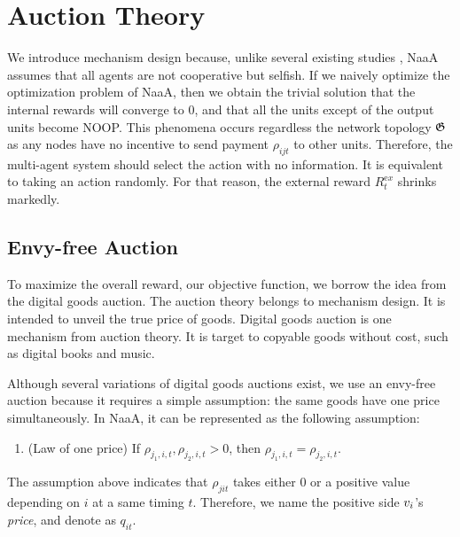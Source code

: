 \section{Auction Theory}



We introduce mechanism design because, unlike several existing studies \citep{sukhbaatar2016learning}, NaaA assumes that all agents are not cooperative but selfish.
If we naively optimize the optimization problem of NaaA, then we obtain the trivial solution that the internal rewards will converge to 0, and that all the units except of the output units become NOOP.
This phenomena occurs regardless the network topology $\mathfrak{G}$ as any nodes have no incentive to send payment $\rho_{ijt}$ to other units.
Therefore, the multi-agent system should select the action with no information. It is equivalent to taking an action randomly.
For that reason, the external reward $R_t^{\mathrm ex}$ shrinks markedly.

\subsection{Envy-free Auction}
To maximize the overall reward, our objective function, we borrow the idea from the digital goods auction.
The auction theory belongs to mechanism design. It is intended to unveil the true price of goods.
Digital goods auction is one mechanism from auction theory.
It is target to copyable goods without cost, such as digital books and music.

Although several variations of digital goods auctions exist,
we use an envy-free auction \citep{guruswami2005profit} because it requires a simple assumption: the same goods have one price simultaneously.
In NaaA, it can be represented as the following assumption:
\begin{enumerate}
\renewcommand{\labelenumi}{N\arabic{enumi}:}
\setcounter{enumi}{4}
\item (Law of one price)
	If $\rho_{j_1,i,t}, \rho_{j_2,i,t} > 0$, then $\rho_{j_1,i,t} = \rho_{j_2,i,t}$.
\end{enumerate}
The assumption above indicates that $\rho_{jit}$ takes either 0 or a positive value depending on $i$ at a same timing $t$.
Therefore, we name the positive side $v_{i}$'s {\em price}, and denote as $q_{it}$.

